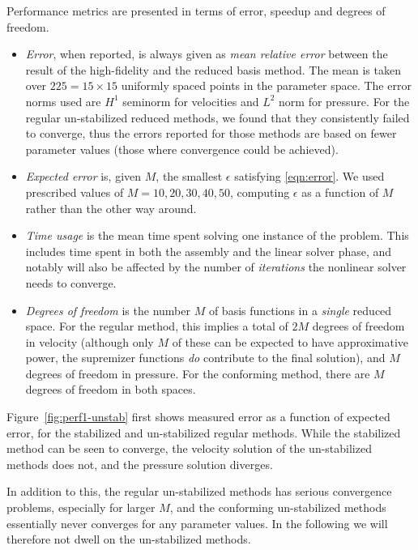 \documentclass[onecolumn, twoside, a4paper, 11pt]{article}
\begin{document}
Performance metrics are presented in terms of error, speedup and degrees of
freedom.
\begin{itemize}
  \item \emph{Error}, when reported, is always given as
    \emph{mean relative error} between the result of the high-fidelity and the
    reduced basis method. The mean is taken over $225 = 15 \times 15$ uniformly
    spaced points in the parameter space. The error norms used are $H^1$
    seminorm for velocities and $L^2$ norm for pressure. For the regular
    un-stabilized reduced methods, we found that they consistently failed to
    converge, thus the errors reported for those methods are based on fewer
    parameter values (those where convergence could be achieved).
  \item \emph{Expected error} is, given $M$, the smallest $\epsilon$ satisfying
    \eqref{eqn:error}. We used prescribed values of $M=10,20,30,40,50$,
    computing $\epsilon$ as a function of $M$ rather than the other way around.
  \item \emph{Time usage} is the mean time spent solving one instance of the problem. This includes
    time spent in both the assembly and the linear solver phase, and notably will also be affected
    by the number of \emph{iterations} the nonlinear solver needs to converge.
  \item \emph{Degrees of freedom} is the number $M$ of basis functions in a
    \emph{single} reduced space. For the regular method, this implies a total of
    $2M$ degrees of freedom in velocity (although only $M$ of these can be
    expected to have approximative power, the supremizer functions \emph{do}
    contribute to the final solution), and $M$ degrees of freedom in pressure.
    For the conforming method, there are $M$ degrees of freedom in both spaces.
\end{itemize}

Figure~\ref{fig:perf1-unstab} first shows measured error as a function of
expected error, for the stabilized and un-stabilized regular methods. While the
stabilized method can be seen to converge, the velocity solution of the
un-stabilized methods does not, and the pressure solution diverges.

In addition to this, the regular un-stabilized methods has serious convergence
problems, especially for larger $M$, and the conforming un-stabilized methods
essentially never converges for any parameter values. In the following we will
therefore not dwell on the un-stabilized methods.
\end{document}
